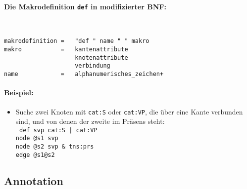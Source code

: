 \documentclass[12pt]{scrartcl}
\begin{document}
\paragraph*{Die Makrodefinition \texttt{def} in modifizierter BNF:}
~
\begin{framed}
\begin{lstlisting}
makrodefinition =   "def " name " " makro
makro           =   kantenattribute
                    knotenattribute
                    verbindung
name            =   alphanumerisches_zeichen+
\end{lstlisting}
\end{framed}


\paragraph*{Beispiel:}
\begin{itemize}
	\item Suche zwei Knoten mit \texttt{cat:S} oder \texttt{cat:VP}, die über eine Kante verbunden sind, und von denen der zweite im Präsens steht:\\
	{\tt
	def svp cat:S | cat:VP\\[-.4ex]
	node @s1 svp\\[-.4ex]
	node @s2 svp \& tns:prs\\[-.4ex]
	edge @s1@s2\\[-.4ex]
	}
\end{itemize}



\subsection{Annotation}
\end{document}
